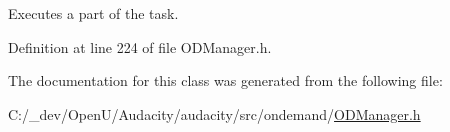 Executes a part of the task. 



Definition at line 224 of file O\+D\+Manager.\+h.



The documentation for this class was generated from the following file\+:\begin{DoxyCompactItemize}
\item 
C\+:/\+\_\+dev/\+Open\+U/\+Audacity/audacity/src/ondemand/\hyperlink{_o_d_manager_8h}{O\+D\+Manager.\+h}\end{DoxyCompactItemize}

